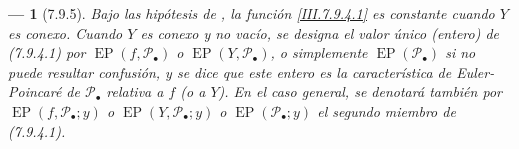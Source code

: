 \documentclass[10pt,oneside,openany]{book}
\theoremstyle{egaenv}\newtheorem*{env}{---}
\theoremstyle{egastatement}
\theoremstyle{egadescription}
\begin{document}
\begin{env}[7.9.5]
\label{III.7.9.5}
\label{III.7.9.5.fr}
Bajo las hipótesis de , la función
\eqref{III.7.9.4.1} es \emph{constante} cuando $Y$ es
\emph{conexo}. Cuando $Y$ es conexo y no vacío, se designa
el valor único (entero) de (7.9.4.1) por $\operatorname{EP}(f,\mathscr P_\bullet)$ o $\operatorname{EP}(Y,\mathscr P_\bullet)$, o simplemente
$\operatorname{EP}(\mathscr P_\bullet)$
si no puede resultar confusión, y se dice que este entero es la
\emph{característica de Euler-Poincaré} de $\mathscr P_\bullet$
relativa a $f$ (o a $Y$). En el caso general, se denotará también por $\operatorname{EP}(f,\mathscr P_\bullet;y)$ o $\operatorname{EP}(Y,\mathscr P_\bullet;y)$ o
$\operatorname{EP}(\mathscr P_\bullet;y)$
el segundo miembro de (7.9.4.1).
\end{env}
\end{document}
